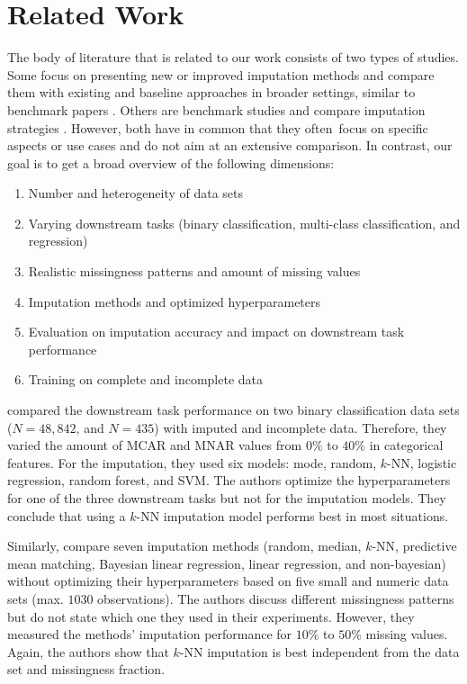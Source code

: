 \documentclass[utf8]{frontiersSCNS} %
\begin{document}
\section{Related Work}
\label{sec:related_work}
%
The body of literature that is related to our work consists of two types of studies. Some focus on presenting new or improved imputation methods and compare them with existing and baseline approaches in broader settings, similar to benchmark papers \citep{Imputation_Benchmark_4, Imputation_Benchmark_6}. Others are benchmark studies and compare imputation strategies \citep{Imputation_Benchmark_1, Imputation_Benchmark_2, Imputation_Benchmark_3}. However, both have in common that they often focus on specific aspects or use cases and do not aim at an extensive comparison. In contrast, our goal is to get a broad overview of the following dimensions:
%
\begin{enumerate}
	\item Number and heterogeneity of data sets
	\item Varying downstream tasks (binary classification, multi-class classification, and regression)
	\item Realistic missingness patterns and amount of missing values
	\item Imputation methods and optimized hyperparameters
	\item Evaluation on imputation accuracy and impact on downstream task performance
	\item Training on complete and incomplete data
\end{enumerate}

\cite{Imputation_Benchmark_3} compared the downstream task performance on two binary classification data sets ($N = 48,842$, and $N = 435$) with imputed and incomplete data. Therefore, they varied the amount of MCAR and MNAR values from $0\%$ to $40\%$ in categorical features. For the imputation, they used six models: mode, random, $k$-NN, logistic regression, random forest, and SVM. The authors optimize the hyperparameters for one of the three downstream tasks but not for the imputation models. They conclude that using a $k$-NN imputation model performs best in most situations.

Similarly, \cite{Imputation_Benchmark_2} compare seven imputation methods (random, median, $k$-NN, predictive mean matching, Bayesian linear regression, linear regression, and non-bayesian) without optimizing their hyperparameters based on five small and numeric data sets (max. $1030$ observations). The authors discuss different missingness patterns but do not state which one they used in their experiments. However, they measured the methods' imputation performance for $10\%$ to $50\%$ missing values. Again, the authors show that $k$-NN imputation is best independent from the data set and missingness fraction.
\end{document}

